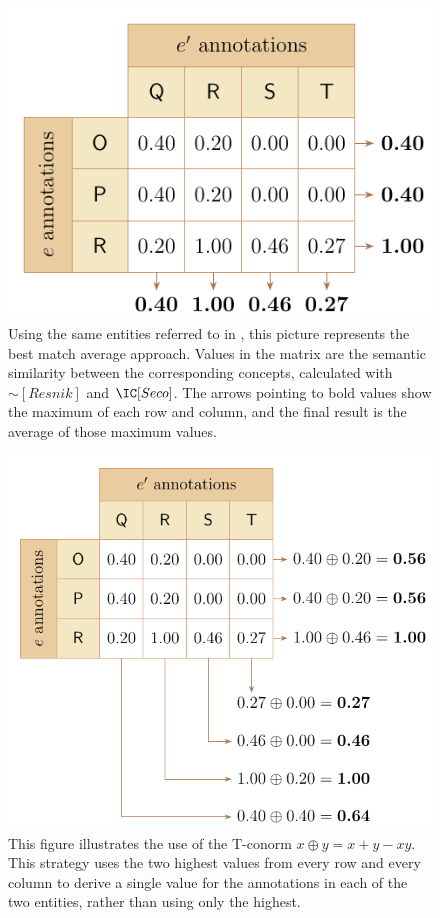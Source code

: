 \begin{figure}
    \centering
    \includegraphics{images/bma.pdf}
    \caption[Example of the best match average in action]{Using the same entities referred to in , this picture represents the best match average approach. Values in the matrix are the semantic similarity between the corresponding concepts, calculated with $\sim[Resnik]$ and $\IC[Seco]$. The arrows pointing to bold values show the maximum of each row and column, and the final result is the average of those maximum values.}
    \label{fig:bma}
\end{figure}

\begin{figure}
    \centering
    \includegraphics{images/bma-tconorm.pdf}
    \caption[The T-conorm aggregation strategy]{This figure illustrates the use of the T-conorm $x \oplus y = x + y - xy$. This strategy uses the two highest values from every row and every column to derive a single value for the annotations in each of the two entities, rather than using only the highest.}
    \label{fig:bma-tconorm}
\end{figure}


